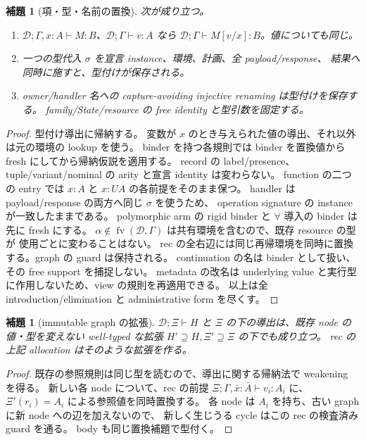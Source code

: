 \documentclass[11pt,a4paper]{article}
\newtheorem{lemma}[definition]{補題}
\newcommand{\fv}{\operatorname{fv}}
\newcommand{\D}{\mathcal D}
\newcommand{\ty}{\mathrel{\vdash}}
\begin{document}
\begin{lemma}[項・型・名前の置換]
次が成り立つ。
\begin{enumerate}
\item \(\D;\Gamma,x:A\ty M:B\)、\(\D;\Gamma\ty v:A\) なら
      \(\D;\Gamma\ty M[v/x]:B\)。値についても同じ。
\item 一つの型代入 \(\sigma\) を宣言 instance、環境、計画、全 payload/response、
      結果へ同時に施すと、型付けが保存される。
\item owner/handler 名への capture-avoiding injective renaming は型付けを保存する。
      family/State/resource の free identity と型引数を固定する。
\end{enumerate}
\end{lemma}
\begin{proof}
型付け導出に帰納する。
変数が \(x\) のとき与えられた値の導出、それ以外は元の環境の lookup を使う。
binder を持つ各規則では binder を置換値から fresh にしてから帰納仮説を適用する。
record の label/presence、tuple/variant/nominal の arity と宣言 identity は変わらない。
function の二つの entry では \(x:A\) と \(x:UA\) の各前提をそのまま保つ。
handler は payload/response の両方へ同じ \(\sigma\) を使うため、
operation signature の instance が一致したままである。
polymorphic arm の rigid binder と \(\forall\) 導入の binder は先に fresh にする。
\(\alpha\notin\fv(\D,\Gamma)\) は共有環境を含むので、既存 resource の型が
使用ごとに変わることはない。
rec の全右辺には同じ再帰環境を同時に置換する。graph の guard は保持される。
continuation の名は binder として扱い、その free support を捕捉しない。
metadata の改名は underlying value と実行型に作用しないため、view の規則を再適用できる。
以上は全 introduction/elimination と administrative form を尽くす。
\end{proof}

\begin{lemma}[immutable graph の拡張]
\(\D;\Xi\ty H\) と \(\Xi\) の下の導出は、既存 node の値・型を変えない
well-typed な拡張 \(H'\supseteq H,\Xi'\supseteq\Xi\) の下でも成り立つ。
rec の上記 allocation はそのような拡張を作る。
\end{lemma}
\begin{proof}
既存の参照規則は同じ型を読むので、導出に関する帰納法で weakening を得る。
新しい各 node について、rec の前提
\(\Xi;\Gamma,\bar x:\bar A\ty v_i:A_i\) に、
\(\Xi'(r_i)=A_i\) による参照値を同時置換する。
各 node は \(A_i\) を持ち、古い graph に新 node への辺を加えないので、
新しく生じうる cycle はこの rec の検査済み guard を通る。
body も同じ置換補題で型付く。
\end{proof}
\end{document}
